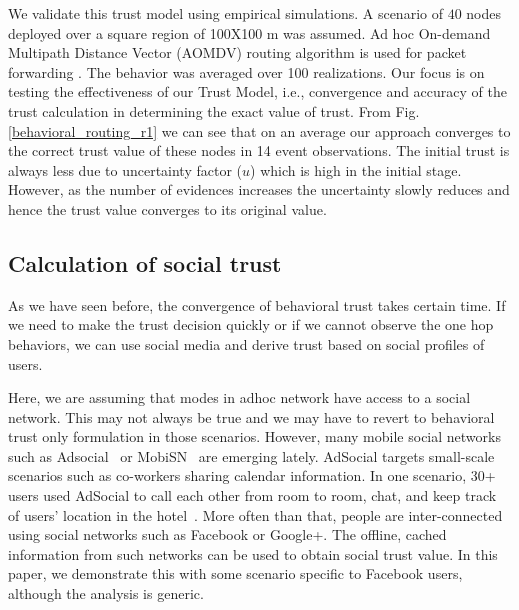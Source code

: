 \documentclass[conference]{IEEEtran}
\begin{document}
We validate this trust model using empirical simulations. A scenario of $40$ nodes deployed over a square region of 100X100 m was assumed.  Ad hoc On-demand Multipath Distance Vector (AOMDV) routing algorithm is used for packet forwarding \cite{marina2002ad}. The behavior was averaged over 100 realizations. Our focus is on testing the effectiveness of our Trust Model, i.e., convergence and accuracy of the trust
calculation in determining the exact value of trust. From Fig. \ref{behavioral_routing_r1} we can see that on an average our approach converges to the correct trust value of these nodes in 14 event observations. The initial trust is always less due to uncertainty factor ($u$) which is high in the initial stage. However, as the number of evidences increases the uncertainty slowly reduces and hence the trust value converges to its original value.




\subsection{Calculation of social trust}
As we have seen before, the convergence of behavioral trust takes certain time. If we need to make the trust decision quickly or if we cannot observe the one hop behaviors, we can use social media and derive trust based on social profiles of users.

Here, we are assuming that modes in adhoc network have access to a social network. This may not always be true and we may have to revert to behavioral trust only formulation in those scenarios. However, many mobile social networks such as Adsocial~\cite{sarigl09} or MobiSN~\cite{li09mobisn} are emerging lately. AdSocial targets small-scale scenarios such as  co-workers sharing calendar information. In one scenario, 30+ users used AdSocial to call each other from room to room, chat, and keep track of users’ location in the hotel~\cite{sarigl09}. More often than that, people are inter-connected using social networks such as Facebook or Google+. The offline, cached information from such networks can be used to obtain social trust value. In this paper, we demonstrate this with some scenario specific to Facebook users, although the analysis is generic.
\end{document}
